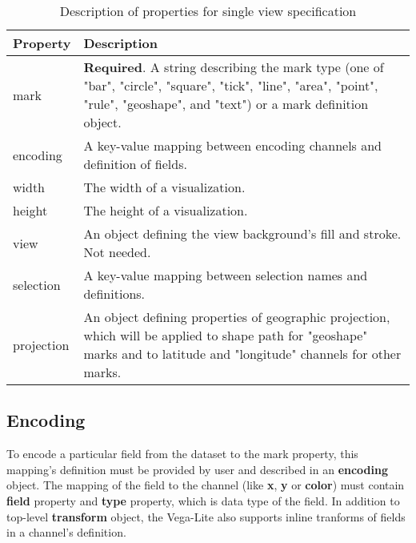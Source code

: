   \begin{table}[htbp]
        \centering
        \caption{Description of properties for single view specification\cite{vega-lite-single-view-specification}}
        \label{table:single-view-specifications}
            \begin{tabular}{ m{8em} m{22em} }
            \toprule
                \textbf{Property} & \textbf{Description} \\
            \toprule

       mark                         & \textbf{Required}. A string describing the mark type (one of "bar", "circle", "square", "tick", "line", "area", "point", "rule", "geoshape", and "text") or a mark definition object. \\
\hline encoding    & A key-value mapping between encoding channels and definition of fields. \\
\hline width               & The width of a visualization. \\
\hline height           & The height of a visualization. \\
\hline view             & An object defining the view background’s fill and stroke. Not needed. \\
\hline selection     & A key-value mapping between selection names and definitions. \\
\hline projection    & An object defining properties of geographic projection, which will be applied to shape path for "geoshape" marks and to latitude and "longitude" channels for other marks. \\
\hline
            \end{tabular}
        \end{table}

\clearpage

\subsection{Encoding}
To encode a particular field from the dataset to the mark property, this mapping's definition must be provided by user and described in an \textbf{encoding} object.
The mapping of the field to the channel (like \textbf{x}, \textbf{y} or \textbf{color}) must contain \textbf{field} property and \textbf{type} property, which is data type of the field. In addition to top-level \textbf{transform} object, the Vega-Lite also supports inline tranforms of fields in a channel's definition.


